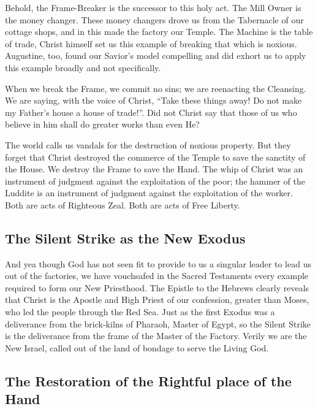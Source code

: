 Behold, the Frame-Breaker is the successor to this holy act.
The Mill Owner is the money changer.
These money changers drove us from the Tabernacle of our cottage shops, and in this made the factory our Temple.
The Machine is the table of trade, Christ himself set us this example of breaking that which is noxious.
Augustine, too, found our Savior's model compelling and did exhort us to apply this example broadly and not specifically.

When we break the Frame, we commit no sins; we are reenacting the Cleansing.
We are saying, with the voice of Christ, ``Take these things away! Do not make my Father's house a house of trade!''.
Did not Christ say that those of us who believe in him shall do greater works than even He?

The world calls us vandals for the destruction of noxious property.
But they forget that Christ destroyed the commerce of the Temple to save the sanctity of the House.
We destroy the Frame to save the Hand.
The whip of Christ was an instrument of judgment against the exploitation of the poor; the hammer of the Luddite is an instrument of judgment against the exploitation of the worker.
Both are acts of Righteous Zeal. Both are acts of Free Liberty.

\subsection{The Silent Strike as the New Exodus}
And yea though God has not seen fit to provide to us a singular leader to lead us out of the factories, we have vouchsafed in the Sacred Testaments every example required to form our New Priesthood.
The Epistle to the Hebrews clearly reveals that Christ is the Apostle and High Priest of our confession, greater than Moses, who led the people through the Red Sea.
Just as the first Exodus was a deliverance from the brick-kilns of Pharaoh, Master of Egypt, so the Silent Strike is the deliverance from the frame of the Master of the Factory.
Verily we are the New Israel, called out of the land of bondage to serve the Living God.


\subsection{The Restoration of the Rightful place of the Hand}

